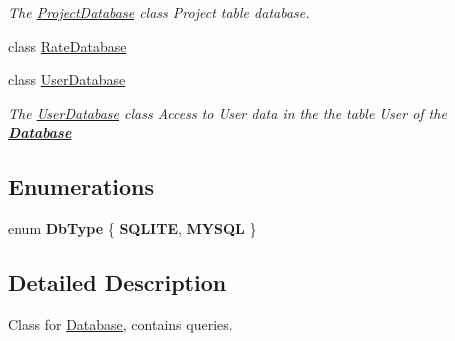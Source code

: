 \begin{DoxyCompactItemize}
\begin{DoxyCompactList}\small\item\em The \hyperlink{classDatabases_1_1ProjectDatabase}{Project\+Database} class Project table database. \end{DoxyCompactList}\item 
class \hyperlink{classDatabases_1_1RateDatabase}{Rate\+Database}
\item 
class \hyperlink{classDatabases_1_1UserDatabase}{User\+Database}
\begin{DoxyCompactList}\small\item\em The \hyperlink{classDatabases_1_1UserDatabase}{User\+Database} class Access to User data in the the table User of the {\bfseries \hyperlink{classDatabases_1_1Database}{Database}} \end{DoxyCompactList}\end{DoxyCompactItemize}
\subsection*{Enumerations}
\begin{DoxyCompactItemize}
\item 
\hypertarget{namespaceDatabases_a14c001ecdc0847befdbd6ea2d49730be}{}enum {\bfseries Db\+Type} \{ {\bfseries S\+Q\+L\+I\+T\+E}, 
{\bfseries M\+Y\+S\+Q\+L}
 \}\label{namespaceDatabases_a14c001ecdc0847befdbd6ea2d49730be}

\end{DoxyCompactItemize}


\subsection{Detailed Description}
Class for \hyperlink{classDatabases_1_1Database}{Database}, contains queries. 